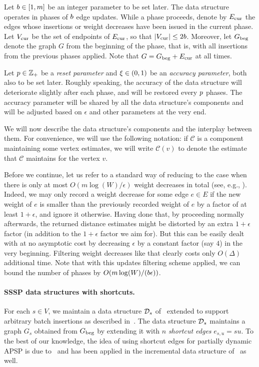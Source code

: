 \documentclass[11pt,letterpaper]{article}
\theoremstyle{plain}
\renewcommand{\O}{O}
\newcommand{\eps}{\ensuremath{\epsilon}}
\begin{document}
Let $b\in [1,m]$ be an integer parameter to be set later.
The data structure operates in phases of $b$ edge updates.
While a phase proceeds, denote by $E_{\mathrm{cur}}$ the edges whose insertions or weight decreases have been issued in the current phase.
Let $V_{\mathrm{cur}}$ be the set of endpoints of $E_{\mathrm{cur}}$, so that $|V_{\mathrm{cur}}|\leq 2b$. Moreover, let $G_{\mathrm{beg}}$ denote the graph $G$ from the beginning of
the phase, that is, with all insertions from the previous phases applied.
Note that $G=G_{\mathrm{beg}}+E_{\mathrm{cur}}$ at all times.

Let $p\in \mathbb{Z}_+$ be a \emph{reset parameter} and $\xi\in (0,1)$ be an \emph{accuracy parameter},
both also to be set later.
Roughly speaking, the accuracy of the data structure will deteriorate slightly after each phase,
and will be restored every $p$ phases.
The accuracy parameter will be shared by all the data structure's components and will
be adjusted based on $\eps$ and other parameters at the very end.

We will now describe the data structure's components and the interplay between them.
For convenience, we will use the following notation: if $\mathcal{C}$ is a component maintaining
some vertex estimates, we will write $\mathcal{C}(v)$ to denote the estimate that $\mathcal{C}$ maintains for
the vertex $v$.

Before we continue, let us refer to a standard way of reducing to the case when there is only at most $\O(m\log(W)/\eps)$ weight decreases in total (see, e.g., \cite{Bernstein16}).
Indeed, we may only record a weight decrease for some edge $e\in E$ if the new weight of $e$ is smaller than the previously recorded weight of $e$ by a factor of at least $1+\eps$, and ignore it otherwise.
Having done that, by proceeding normally afterwards, the returned distance estimates might be distorted by an extra $1+\eps$ factor (in addition to the $1+\eps$ factor we aim for).
But this can be easily dealt with at no asymptotic cost by decreasing $\eps$ by a constant factor (say $4$) in the very beginning.
Filtering weight decreases like that clearly costs only $\O(\Delta)$ additional time.
Note that with this updates filtering scheme applied, we can bound the number of phases by $\O(m\log(W)/(\phlen\eps))$.

\paragraph{SSSP data structures with shortcuts.}
For each $s\in V$, we maintain a data structure $\mathcal{D}_s$ of~ extended to support
arbitrary batch insertions as described in~.
The data structure $\mathcal{D}_s$ maintains a graph $G_s$ obtained from $G_{\mathrm{beg}}$ by extending
it with $n$ \emph{shortcut edges} $e_{s,u}=su$.
To the best of our knowledge, the idea of using shortcut edges for partially dynamic APSP is due to~\cite{Bernstein16} and has been applied in the incremental data structure of~\cite{KarczmarzL19} as well.
\end{document}
